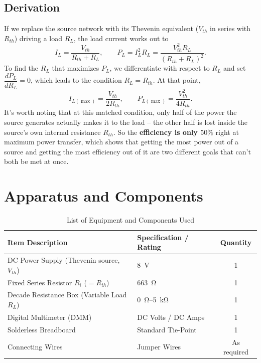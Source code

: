 \subsection{Derivation}
If we replace the source network with its Thevenin equivalent ($V_{th}$ in series with $R_{th}$) driving a load $R_L$, the load current works out to
\[
I_L = \frac{V_{th}}{R_{th}+R_L}, \qquad P_L = I_L^2 R_L = \frac{V_{th}^2 R_L}{(R_{th}+R_L)^2}.
\]
To find the $R_L$ that maximizes $P_L$, we differentiate with respect to $R_L$ and set $\dfrac{dP_L}{dR_L}=0$, which leads to the condition $R_L = R_{th}$. At that point,
\[
I_{L(\max)} = \frac{V_{th}}{2R_{th}}, \qquad P_{L(\max)} = \frac{V_{th}^2}{4R_{th}}.
\]
It's worth noting that at this matched condition, only half of the power the source generates actually makes it to the load -- the other half is lost inside the source's own internal resistance $R_{th}$. So the \textbf{efficiency is only $50\%$} right at maximum power transfer, which shows that getting the most power out of a source and getting the most efficiency out of it are two different goals that can't both be met at once.

\section{Apparatus and Components}
\begin{table}[h!]
    \centering
    \caption{List of Equipment and Components Used}
    \vspace{2mm}
    \begin{tabular}{llc}
        \toprule
        \textbf{Item Description} & \textbf{Specification / Rating} & \textbf{Quantity} \\
        \midrule
        DC Power Supply (Thevenin source, $V_{th}$) & \qty{8}{\volt} & 1 \\
        Fixed Series Resistor $R_i$ ($=R_{th}$) & \qty{663}{\ohm} & 1 \\
        Decade Resistance Box (Variable Load $R_L$) & \qty{0}{\ohm}--\qty{5}{\kilo\ohm} & 1 \\
        Digital Multimeter (DMM) & DC Volts / DC Amps & 1 \\
        Solderless Breadboard & Standard Tie-Point & 1 \\
        Connecting Wires & Jumper Wires & As required \\
        \bottomrule
    \end{tabular}
    \label{tab:apparatus6}
\end{table}

